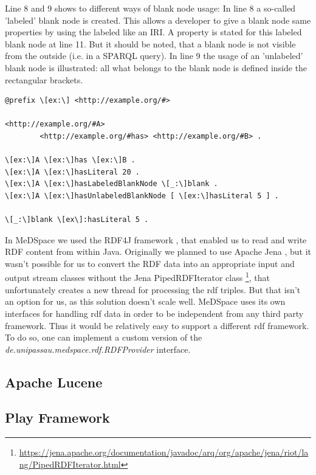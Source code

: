Line 8 and 9 shows to different ways of blank node usage: In line 8 a so-called 'labeled' blank node is created. This allows a developer to give a blank node same properties by using the labeled like an IRI. A property is stated for this labeled blank node at line 11.
But it should be noted, that a blank node is not visible from the outside (i.e. in a SPARQL query).
In line 9 the usage of an 'unlabeled' blank node is illustrated: all what belongs to the blank node is defined inside the rectangular brackets.

\begin{lstlisting}[style=RdfCodeStyle, caption=RDF example data in Turtle syntax, label=listing1]
@prefix \[ex:\] <http://example.org/#>

<http://example.org/#A> 
		<http://example.org/#has> <http://example.org/#B> .

\[ex:\]A \[ex:\]has \[ex:\]B .
\[ex:\]A \[ex:\]hasLiteral 20 .
\[ex:\]A \[ex:\]hasLabeledBlankNode \[_:\]blank .
\[ex:\]A \[ex:\]hasUnlabeledBlankNode [ \[ex:\]hasLiteral 5 ] .

\[_:\]blank \[ex\]:hasLiteral 5 .
\end{lstlisting}


In MeDSpace we used the RDF4J framework \cite{RDF4J}, that enabled us to read and write RDF content from within Java. Originally we planned to use Apache Jena \cite{Jena}, but it wasn't possible for us to convert the RDF data into an appropriate input and output stream classes without the Jena PipedRDFIterator class \footnote{\url{https://jena.apache.org/documentation/javadoc/arq/org/apache/jena/riot/lang/PipedRDFIterator.html}}, that unfortunately creates a new thread for processing the rdf triples. But that isn't an option for us, as this solution doesn't scale well. 
MeDSpace uses its own interfaces for handling rdf data in order to be independent from any third party framework. Thus it would be relatively easy to support a different rdf framework. To do so, one can implement a custom version of the \emph{de.unipassau.medspace.rdf.RDFProvider} interface. 

\subsection{Apache Lucene}

\subsection{Play Framework}

